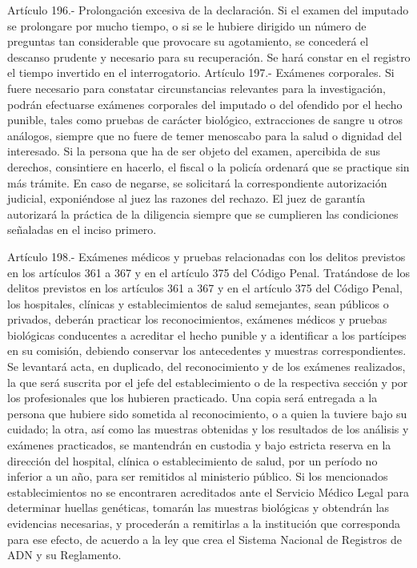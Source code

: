     Artículo 196.- Prolongación excesiva de la declaración. Si el examen del imputado se prolongare por mucho tiempo, o si se le hubiere dirigido un número de preguntas tan considerable que provocare su agotamiento, se concederá el descanso prudente y necesario para su recuperación.
    Se hará constar en el registro el tiempo invertido en el interrogatorio.
    Artículo 197.- Exámenes corporales. Si fuere necesario para constatar circunstancias relevantes para la investigación, podrán efectuarse exámenes corporales del imputado o del ofendido por el hecho punible, tales como pruebas de carácter biológico, extracciones de sangre u otros análogos, siempre que no fuere de temer menoscabo para la salud o dignidad del interesado.
    Si la persona que ha de ser objeto del examen, apercibida de sus derechos, consintiere en hacerlo, el fiscal o la policía ordenará que se practique sin más trámite. En caso de negarse, se solicitará la correspondiente autorización judicial, exponiéndose al juez las razones del rechazo.
    El juez de garantía autorizará la práctica de la diligencia siempre que se cumplieren las condiciones señaladas en el inciso primero.

    Artículo 198.- Exámenes médicos y pruebas relacionadas con los delitos previstos en los artículos 361 a 367 y en el artículo 375 del Código Penal. Tratándose de los delitos previstos en los artículos 361 a 367 y en el artículo 375 del Código Penal, los hospitales, clínicas y establecimientos de salud semejantes, sean públicos o privados, deberán practicar los reconocimientos, exámenes médicos y pruebas biológicas conducentes a acreditar el hecho punible y a identificar a los partícipes en su comisión, debiendo conservar los antecedentes y muestras correspondientes.
    Se levantará acta, en duplicado, del reconocimiento y de los exámenes realizados, la que será suscrita por el jefe del establecimiento o de la respectiva sección y por los profesionales que los hubieren practicado. Una copia será entregada a la persona que hubiere sido sometida al reconocimiento, o a quien la tuviere bajo su cuidado; la otra, así como las muestras obtenidas y los resultados de los análisis y exámenes practicados, se mantendrán en custodia y bajo estricta reserva en la dirección del hospital, clínica o establecimiento de salud, por un período no inferior a un año, para ser remitidos al ministerio público.
    Si los mencionados establecimientos no se encontraren acreditados ante el Servicio Médico Legal para determinar huellas genéticas, tomarán las muestras biológicas y obtendrán las evidencias necesarias, y procederán a remitirlas a la institución que corresponda para ese efecto, de acuerdo a la ley que crea el Sistema Nacional de Registros de ADN y su Reglamento.




